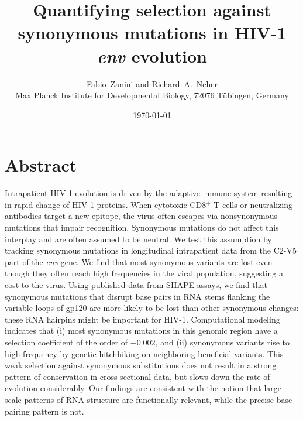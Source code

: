 \documentclass[11pt]{article}
\newcommand{\env}{\textit{env}}
\newcommand{\shankaregion}{C2-V5}
\newcommand{\Author}{Fabio~Zanini and Richard~A.~Neher}
\newcommand{\Title}{Quantifying selection against synonymous mutations in HIV-1 \env{} evolution}
\newcommand{\Affiliation}{Max Planck Institute for Developmental Biology, 72076 T\"ubingen, Germany}
\begin{document}
\title{\Title}
\author{\Author\\ \Affiliation}
\date{\today}
\maketitle

\newpage
\section*{Abstract}
\noindent
Intrapatient HIV-1 evolution is driven by the adaptive immune system
resulting in rapid change of HIV-1 proteins. When cytotoxic CD8${}^+$ T-cells
or neutralizing antibodies target a new epitope, the virus often escapes via
nonsynonymous mutations that impair recognition. Synonymous mutations do not
affect this interplay and are often assumed to be neutral. We test this
assumption by tracking  synonymous mutations in 
longitudinal intrapatient data from the \shankaregion{} part of the \env{}
gene. We find that most synonymous variants are lost even though
they often reach high frequencies in the viral population, suggesting a
cost to the virus. Using published data
from SHAPE assays, we find that synonymous mutations that disrupt base pairs
in RNA stems flanking the variable loops of gp120 are more likely to be lost than other
synonymous changes: these RNA hairpins might be important for HIV-1.
Computational modeling indicates that (i) most synonymous mutations in this
genomic region have a selection coefficient of the order of $-0.002$, and
(ii) synonymous variants rise to high frequency by genetic hitchhiking on neighboring beneficial
variants. This weak selection against synonymous substitutions does not
result in a strong pattern of conservation in cross sectional data, but
slows down the rate of evolution considerably. Our findings are consistent with the
notion that large scale patterns of RNA structure are functionally
relevant, while the precise base pairing pattern is not.
\end{document}

